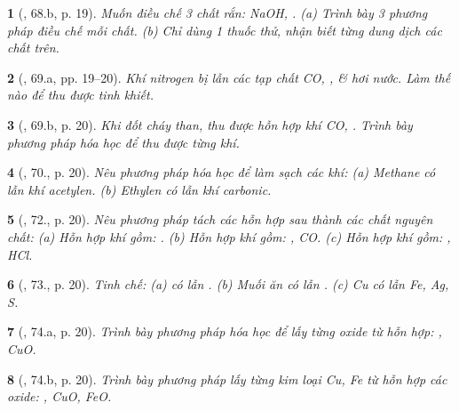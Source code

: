 \documentclass{article}
\newtheorem{baitoan}{}
\begin{document}
\begin{baitoan}[\cite{An_400_BT_Hoa_Hoc_9}, 68.b, p. 19]
	Muốn điều chế 3 chất rắn: {\rm NaOH, }. (a) Trình bày 3 phương pháp điều chế mỗi chất. (b) Chỉ dùng 1 thuốc thử, nhận biết từng dung dịch các chất trên.
\end{baitoan}

\begin{baitoan}[\cite{An_400_BT_Hoa_Hoc_9}, 69.a, pp. 19--20]
	Khí nitrogen bị lẫn các tạp chất {\rm CO, }, \& hơi nước. Làm thế nào để thu được {\rm{}} tinh khiết.
\end{baitoan}

\begin{baitoan}[\cite{An_400_BT_Hoa_Hoc_9}, 69.b, p. 20]
	Khi đốt cháy than, thu được hỗn hợp khí {\rm CO, }. Trình bày phương pháp hóa học để thu được từng khí.
\end{baitoan}

\begin{baitoan}[\cite{An_400_BT_Hoa_Hoc_9}, 70., p. 20]
	Nêu phương pháp hóa học để làm sạch các khí: (a) Methane có lẫn khí acetylen. (b) Ethylen có lẫn khí carbonic.
\end{baitoan}

\begin{baitoan}[\cite{An_400_BT_Hoa_Hoc_9}, 72., p. 20]
	Nêu phương pháp tách các hỗn hợp sau thành các chất nguyên chất: (a) Hỗn hợp khí gồm: {\rm{}}. (b) Hỗn hợp khí gồm: {\rm{}, CO}. (c) Hỗn hợp khí gồm: {\rm{}, HCl}.
\end{baitoan}

\begin{baitoan}[\cite{An_400_BT_Hoa_Hoc_9}, 73., p. 20]
	Tinh chế: (a) {\rm{}} có lẫn {\rm{}}. (b) Muối ăn có lẫn {\rm{}}. (c) {\rm Cu} có lẫn {\rm Fe, Ag, S}.
\end{baitoan}

\begin{baitoan}[\cite{An_400_BT_Hoa_Hoc_9}, 74.a, p. 20]
	Trình bày phương pháp hóa học để lấy từng oxide từ hỗn hợp: {\rm{}, CuO}.
\end{baitoan}

\begin{baitoan}[\cite{An_400_BT_Hoa_Hoc_9}, 74.b, p. 20]
	Trình bày phương pháp lấy từng kim loại {\rm Cu, Fe} từ hỗn hợp các oxide: {\rm{}, CuO, FeO}.
\end{baitoan}
\end{document}
